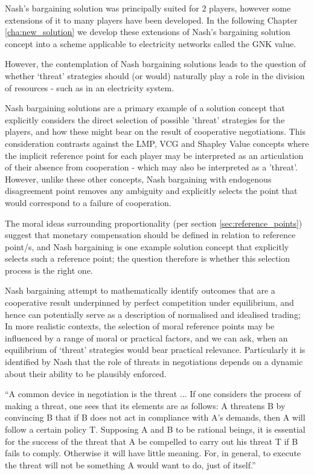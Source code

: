 Nash's bargaining solution was principally suited for 2 players, however some extensions of it to many players have been developed.
In the following Chapter \ref{cha:new_solution} we develop these extensions of Nash's bargaining solution concept into a scheme applicable to electricity networks called the GNK value.

However, the contemplation of Nash bargaining solutions leads to the question of whether `threat' strategies should (or would) naturally play a role in the division of resources - such as in an electricity system.

Nash bargaining solutions are a primary example of a solution concept that explicitly considers the direct selection of possible 'threat' strategies for the players, and how these might bear on the result of cooperative negotiations.
This consideration contrasts against the LMP, VCG and Shapley Value concepts where the implicit reference point for each player may be interpreted as an articulation of their absence from cooperation - which may also be interpreted as a 'threat'.
However, unlike these other concepts, Nash bargaining with endogenous disagreement point removes any ambiguity and explicitly selects the point that would correspond to a failure of cooperation.

The moral ideas surrounding proportionality (per section \ref{sec:reference_points}) suggest that monetary compensation should be defined in relation to reference point/s, and Nash bargaining is one example solution concept that explicitly selects such a reference point; the question therefore is whether this selection process is the right one.

Nash bargaining attempt to mathematically identify outcomes that are a cooperative result underpinned by perfect competition under equilibrium, and hence can potentially serve as a description of normalised and idealised trading;
In more realistic contexts, the selection of moral reference points may be influenced by a range of moral or practical factors, and we can ask, when an equilibrium of `threat' strategies would bear practical relevance.
Particularly it is identified by Nash that the role of threats in negotiations depends on a dynamic about their ability to be plausibly enforced.

\begin{displayquote}
``A common device in negotiation is the threat ... If one considers the process of making a threat, one sees that its elements are as follows: A threatens B by convincing B that if B does not act in compliance with A's demands, then A will follow a certain policy T. Supposing A and B to be rational beings, it is essential for the success of the threat that A be compelled to carry out his threat T if B fails to comply. Otherwise it will have little meaning. For, in general, to execute the threat will not be something A would want to do, just of itself.''
\citep{nash2}
\end{displayquote}

